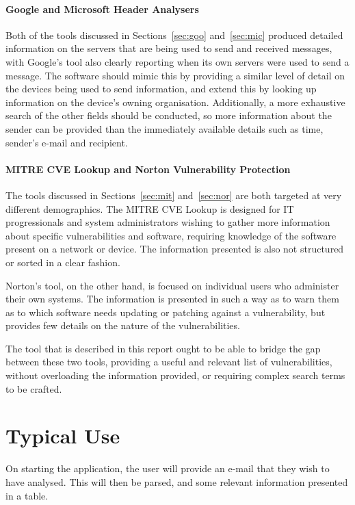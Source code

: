   \paragraph{Google and Microsoft Header Analysers} Both of the tools discussed in Sections~\ref{sec:goo} and~\ref{sec:mic} produced detailed information on the servers that are being used to send and received messages, with Google's tool also clearly reporting when its own servers were used to send a message.  The software should mimic this by providing a similar level of detail on the devices being used to send information, and extend this by looking up information on the device's owning organisation.  Additionally, a more exhaustive search of the other fields should be conducted, so more information about the sender can be provided than the immediately available details such as time, sender's e-mail and recipient.

  \paragraph{MITRE CVE Lookup and Norton Vulnerability Protection} The tools discussed in Sections~\ref{sec:mit} and~\ref{sec:nor} are both targeted at very different demographics.  The MITRE CVE Lookup is designed for IT progressionals and system administrators wishing to gather more information about specific vulnerabilities and software, requiring knowledge of the software present on a network or device.  The information presented is also not structured or sorted in a clear fashion.

  Norton's tool, on the other hand, is focused on individual users who administer their own systems.  The information is presented in such a way as to warn them as to which software needs updating or patching against a vulnerability, but provides few details on the nature of the vulnerabilities.

  The tool that is described in this report ought to be able to bridge the gap between these two tools, providing a useful and relevant list of vulnerabilities, without overloading the information provided, or requiring complex search terms to be crafted. 

  \section{Typical Use}

  On starting the application, the user will provide an e-mail that they wish
  to have analysed.  This will then be parsed, and some relevant information
  presented in a table.

